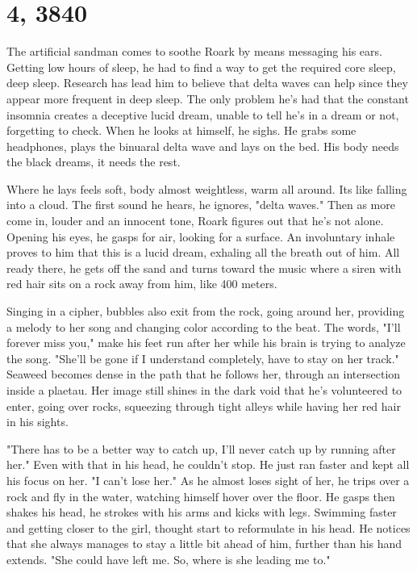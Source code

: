 \section{4, 3840}

		The artificial sandman comes to soothe Roark by means messaging his ears. Getting low hours of sleep, he had to find a way to get
	the required core sleep, deep sleep. Research has lead him to believe that delta waves can help since they appear more frequent in deep sleep.
	The only problem he's had that the constant insomnia creates a deceptive lucid dream, unable to tell he's in a dream or not, forgetting to
	check. When he looks at himself, he sighs. He grabs some headphones, plays the binuaral delta wave and lays on the bed. His body needs the
	black dreams, it needs the rest.

		Where he lays feels soft, body almost weightless, warm all around. Its like falling into a cloud. The first sound he hears, he 
	ignores, "delta waves." Then as more come in, louder and an innocent tone, Roark figures out that he's not alone. Opening his eyes, he gasps
	for air, looking for a surface. An involuntary inhale proves to him that this is a lucid dream, exhaling all the breath out of him. All ready
	there, he gets off the sand and turns toward the music where a siren with red hair sits on a rock away from him, like 400 meters.

		Singing in a cipher, bubbles also exit from the rock, going around her, providing a melody to her song and changing color according
	to the beat. The words, "I'll forever miss you,"  make his feet run after her while his brain is trying to analyze the song. "She'll be
    gone if I understand completely, have to stay on her track." Seaweed becomes dense in the path that he follows her, through an
    intersection inside a plaetau. Her image still shines in the dark void that he's volunteered to enter, going over rocks, squeezing through
    tight alleys while having her red hair in his sights.

        "There has to be a better way to catch up, I'll never catch up by running after her." Even with that in his head, he couldn't stop. He
    just ran faster and kept all his focus on her. "I can't lose her." As he almost loses sight of her, he trips over a rock and fly in the
    water, watching himself hover over the floor. He gasps then shakes his head, he strokes with his arms and kicks with legs. Swimming faster
    and getting closer to the girl, thought start to reformulate in his head. He notices that she always manages to stay a little bit ahead of
    him, further than his hand extends. "She could have left me. So, where is she leading me to."

